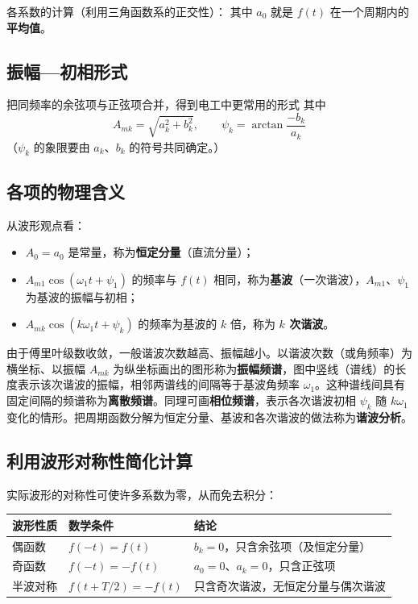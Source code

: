 各系数的计算（利用三角函数系的正交性）：
其中 $a_0$ 就是 $f(t)$ 在一个周期内的\textbf{平均值}。

\subsection{振幅—初相形式}
把同频率的余弦项与正弦项合并，得到电工中更常用的形式
其中
\begin{equation}
A_{mk}=\sqrt{a_k^2+b_k^2},\qquad \psi_k=\arctan\frac{-b_k}{a_k}
\end{equation}
（$\psi_k$ 的象限要由 $a_k$、$b_k$ 的符号共同确定。）

\subsection{各项的物理含义}
从波形观点看：
\begin{itemize}
  \item $A_0=a_0$ 是常量，称为\textbf{恒定分量}（直流分量）；
  \item $A_{m1}\cos\left(\omega_1t+\psi_1\right)$ 的频率与 $f(t)$ 相同，称为\textbf{基波}（一次谐波），$A_{m1}$、$\psi_1$ 为基波的振幅与初相；
  \item $A_{mk}\cos\left(k\omega_1t+\psi_k\right)$ 的频率为基波的 $k$ 倍，称为 \textbf{$k$ 次谐波}。
\end{itemize}
由于傅里叶级数收敛，一般谐波次数越高、振幅越小。以谐波次数（或角频率）为横坐标、以振幅 $A_{mk}$ 为纵坐标画出的图形称为\textbf{振幅频谱}，图中竖线（谱线）的长度表示该次谐波的振幅，相邻两谱线的间隔等于基波角频率 $\omega_1$。这种谱线间具有固定间隔的频谱称为\textbf{离散频谱}。同理可画\textbf{相位频谱}，表示各次谐波初相 $\psi_k$ 随 $k\omega_1$ 变化的情形。把周期函数分解为恒定分量、基波和各次谐波的做法称为\textbf{谐波分析}。

\subsection{利用波形对称性简化计算}
实际波形的对称性可使许多系数为零，从而免去积分：
\begin{center}
\begin{tabular}{@{}lll@{}}
\toprule
波形性质 & 数学条件 & 结论 \\
\midrule
偶函数 & $f(-t)=f(t)$ & $b_k=0$，只含余弦项（及恒定分量）\\
奇函数 & $f(-t)=-f(t)$ & $a_0=0$、$a_k=0$，只含正弦项 \\
半波对称 & $f\left(t+T/2\right)=-f(t)$ & 只含奇次谐波，无恒定分量与偶次谐波 \\
\bottomrule
\end{tabular}
\end{center}

